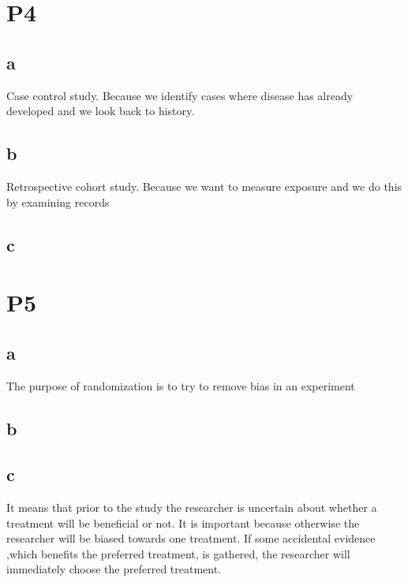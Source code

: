 \documentclass[paper=letter, fontsize=12pt]{article}
\begin{document}
\newpage
\section{P4}
\subsection{a}
Case control study. Because we identify cases where disease has already developed and we look back to history.
\subsection{b}
Retrospective cohort study. Because we want to measure exposure and we do this by examining records
\subsection{c}


\newpage
\section{P5}
\subsection{a}
The purpose of randomization is to try to remove bias in an experiment
\subsection{b}

\subsection{c}
It means that prior to the study the researcher is uncertain about whether a treatment will be beneficial or not. 
It is important because otherwise the researcher will be biased towards one treatment. If some accidental evidence ,which benefits the preferred treatment, is gathered, the researcher will immediately choose the preferred treatment.
\end{document}
